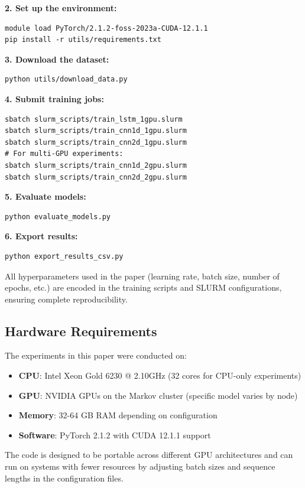 \documentclass[sigconf]{acmart}
\begin{document}
\textbf{2. Set up the environment:}
\begin{verbatim}
module load PyTorch/2.1.2-foss-2023a-CUDA-12.1.1
pip install -r utils/requirements.txt
\end{verbatim}

\textbf{3. Download the dataset:}
\begin{verbatim}
python utils/download_data.py
\end{verbatim}

\textbf{4. Submit training jobs:}
\begin{verbatim}
sbatch slurm_scripts/train_lstm_1gpu.slurm
sbatch slurm_scripts/train_cnn1d_1gpu.slurm
sbatch slurm_scripts/train_cnn2d_1gpu.slurm
# For multi-GPU experiments:
sbatch slurm_scripts/train_cnn1d_2gpu.slurm
sbatch slurm_scripts/train_cnn2d_2gpu.slurm
\end{verbatim}

\textbf{5. Evaluate models:}
\begin{verbatim}
python evaluate_models.py
\end{verbatim}

\textbf{6. Export results:}
\begin{verbatim}
python export_results_csv.py
\end{verbatim}

All hyperparameters used in the paper (learning rate, batch size, number of epochs, etc.) are encoded in the training scripts and SLURM configurations, ensuring complete reproducibility.

\subsection{Hardware Requirements}

The experiments in this paper were conducted on:
\begin{itemize}
  \item \textbf{CPU}: Intel Xeon Gold 6230 @ 2.10GHz (32 cores for CPU-only experiments)
  \item \textbf{GPU}: NVIDIA GPUs on the Markov cluster (specific model varies by node)
  \item \textbf{Memory}: 32-64 GB RAM depending on configuration
  \item \textbf{Software}: PyTorch 2.1.2 with CUDA 12.1.1 support
\end{itemize}

The code is designed to be portable across different GPU architectures and can run on systems with fewer resources by adjusting batch sizes and sequence lengths in the configuration files.
\end{document}
